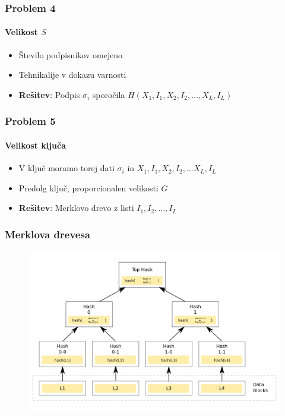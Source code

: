 \documentclass{beamer}    %
\begin{document}
\begin{frame}
    \frametitle{Problem 4}
    \framesubtitle{Velikost $S$}
    \begin{itemize}
        \item Število podpisnikov omejeno
        \item Tehnikalije v dokazu varnosti
        \vspace{1cm}
        \item \textbf{Rešitev}: Podpis $\sigma_i$ sporočila 
            $H(X_1, I_1, X_2, I_2, \dots, X_L, I_L)$
    \end{itemize}
\end{frame}

\begin{frame}
    \frametitle{Problem 5}
    \framesubtitle{Velikost ključa}
    \begin{itemize}
        \item V ključ moramo torej dati $\sigma_i$ in $X_1, I_1, X_2, I_2, 
        \dots X_L, I_L$
        \item Predolg ključ, proporcionalen velikosti $G$
        \vspace{1cm}
        \item \textbf{Rešitev}: Merklovo drevo z listi $I_1, I_2, \dots, I_L$
    \end{itemize}  
\end{frame}

\begin{frame}
    \frametitle{Merklova drevesa}
    \begin{figure}
        \includegraphics[width=\textwidth]{images/merkle-tree.png}
    \end{figure}
\end{frame}
\end{document}
